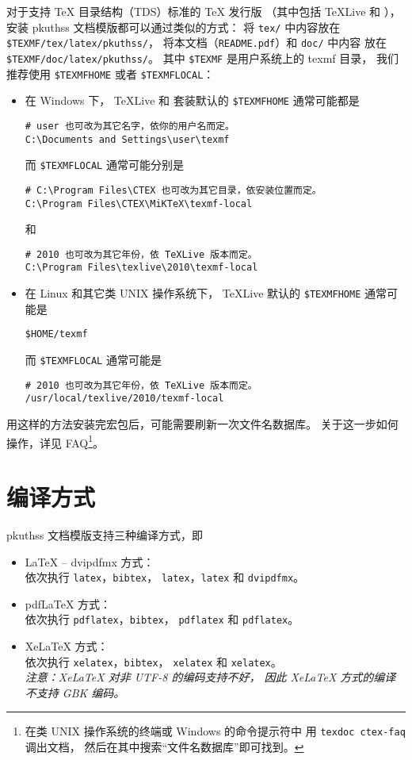 	对于支持 \TeX{} 目录结构（TDS）标准的 \TeX{} 发行版%
	（其中包括 \TeX{}Live 和 \CTeX{}），
	安装 pkuthss 文档模版都可以通过类似的方式：
	将 \verb|tex/| 中内容放在 \verb|$TEXMF/tex/latex/pkuthss/|，
	将本文档（\verb|README.pdf|）和 \verb|doc/| 中内容%
	放在 \verb|$TEXMF/doc/latex/pkuthss/|。
	其中 \verb|$TEXMF| 是用户系统上的 texmf 目录，
	我们推荐使用 \verb|$TEXMFHOME| 或者 \verb|$TEXMFLOCAL|：
	\begin{itemize}
		\item 在 Windows 下，%
			\TeX{}Live 和 \CTeX{} 套装默认的 \verb|$TEXMFHOME| %
			通常可能都是
\begin{Verbatim}[frame = single]
# user 也可改为其它名字，依你的用户名而定。
C:\Documents and Settings\user\texmf
\end{Verbatim}
			而 \verb|$TEXMFLOCAL| 通常可能分别是
\begin{Verbatim}[frame = single]
# C:\Program Files\CTEX 也可改为其它目录，依安装位置而定。
C:\Program Files\CTEX\MiKTeX\texmf-local
\end{Verbatim}
			和
\begin{Verbatim}[frame = single]
# 2010 也可改为其它年份，依 TeXLive 版本而定。
C:\Program Files\texlive\2010\texmf-local
\end{Verbatim}
		\item 在 Linux 和其它类 UNIX 操作系统下，
			\TeX{}Live 默认的 \verb|$TEXMFHOME| 通常可能是
\begin{Verbatim}[frame = single]
$HOME/texmf
\end{Verbatim}
			而 \verb|$TEXMFLOCAL| 通常可能是
\begin{Verbatim}[frame = single]
# 2010 也可改为其它年份，依 TeXLive 版本而定。
/usr/local/texlive/2010/texmf-local
\end{Verbatim}
	\end{itemize}

	用这样的方法安装完宏包后，可能需要刷新一次文件名数据库。
	关于这一步如何操作，详见 \CTeX{} FAQ\cite{ctex-faq}\footnote{%
		在类 UNIX 操作系统的终端或 Windows 的命令提示符中%
		用 \texttt{texdoc ctex-faq} 调出文档，
		然后在其中搜索“文件名数据库”即可找到。%
	}。

	\section{编译方式}

	pkuthss 文档模版支持三种编译方式，即
	\begin{itemize}
		\item \LaTeX{} -- dvipdfmx 方式：\\
			依次执行 \verb|latex|，\verb|bibtex|，%
			\verb|latex|，\verb|latex| 和 \verb|dvipdfmx|。
		\item pdf\LaTeX{} 方式：\\
			依次执行 \verb|pdflatex|，\verb|bibtex|，%
			\verb|pdflatex| 和 \verb|pdflatex|。
		\item Xe\LaTeX{} 方式：\\
			依次执行 \verb|xelatex|，\verb|bibtex|，%
			\verb|xelatex| 和 \verb|xelatex|。\\
			\emph{%
				注意：Xe\LaTeX{} 对非 UTF-8 的编码支持不好，
				因此 Xe\LaTeX{} 方式的编译不支持 GBK 编码。
			}
	\end{itemize}

